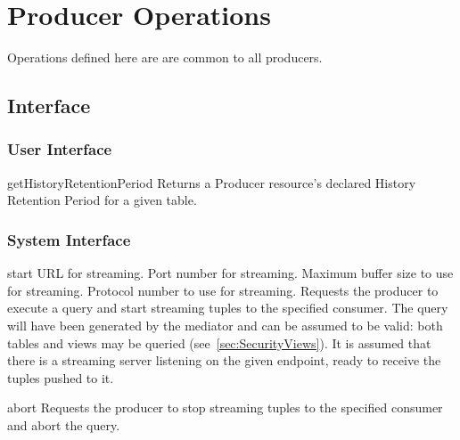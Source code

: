 \section{Producer Operations}\label{sec:Producer}

Operations defined here are are common to all producers. 

\subsection{Interface}

\subsubsection{User Interface}

\begin{method}{getHistoryRetentionPeriod}
\desc Returns a Producer resource's declared History Retention Period for
a given table.
\end{method}

\subsubsection{System Interface}

\begin{method}{start}
 {URL for streaming.}
 {Port number for streaming.}
 {Maximum buffer size to use for streaming.}
 {Protocol number to use for streaming.}
\desc Requests the producer to execute a query and start 
streaming tuples to the specified consumer. The query will have been generated 
by the mediator and can be assumed to be valid: both tables and views may be 
queried (see~\ref{sec:SecurityViews}). It is assumed that there is a streaming 
server listening on the given endpoint, ready to receive the tuples pushed to 
it.
\end{method}

\begin{method}[producer]{abort}
\OK
\desc Requests the producer to stop streaming tuples to the specified consumer and
abort the query.
\end{method}